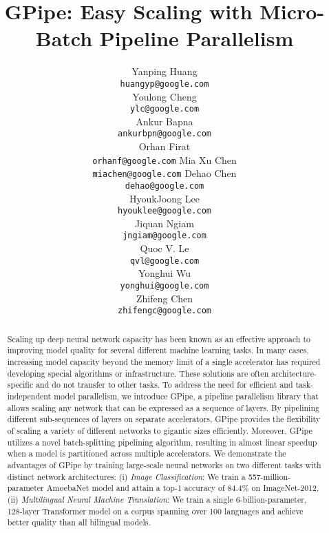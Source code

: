\documentclass{article}
\def\codename{GPipe}
\begin{document}
\title{\codename{}: Easy Scaling with Micro-Batch Pipeline Parallelism}




\author{
Yanping Huang\\
\texttt{huangyp@google.com} \\
\And
Youlong Cheng\\
\texttt{ylc@google.com} \\
\And 
Ankur Bapna \\
\texttt{ankurbpn@google.com} \\
\And
Orhan Firat \\
\texttt{orhanf@google.com}
\And
Mia Xu Chen \\
\texttt{miachen@google.com}
\And
Dehao Chen\\
\texttt{dehao@google.com} \\
\And
HyoukJoong Lee\\
\texttt{hyouklee@google.com} \\
\And
Jiquan Ngiam\\
\texttt{jngiam@google.com}\\
\And
Quoc V. Le \\
\texttt{qvl@google.com}\\
\And
Yonghui Wu\\
\texttt{yonghui@google.com} \\
\And
Zhifeng Chen\\
\texttt{zhifengc@google.com}\\
}

\maketitle

\begin{abstract}
Scaling up deep neural network capacity has been known as an effective approach to improving model quality for several different machine learning tasks. In many cases, increasing model capacity beyond the memory limit of a single accelerator has required developing special algorithms or infrastructure. These solutions are often architecture-specific and do not transfer to other tasks. To address the need for efficient and task-independent model parallelism, we introduce \codename{}, a pipeline parallelism library that allows scaling any network that can be expressed as a sequence of layers. By pipelining different sub-sequences of layers on separate accelerators, \codename{} provides the flexibility of scaling a variety of different networks to gigantic sizes efficiently. Moreover, \codename{} utilizes a novel batch-splitting pipelining algorithm, resulting in almost linear speedup when a model is partitioned across multiple accelerators. We demonstrate the advantages of \codename{} by training large-scale neural networks on two different tasks with distinct network architectures: (i) \textit{Image Classification}: We train a 557-million-parameter AmoebaNet model and attain a top-1 accuracy of 84.4\% on ImageNet-2012, (ii) \textit{Multilingual Neural Machine Translation}: We train a single 6-billion-parameter, 128-layer Transformer model on a corpus spanning over 100 languages and achieve better quality than all bilingual models.
\end{abstract}
\end{document}
